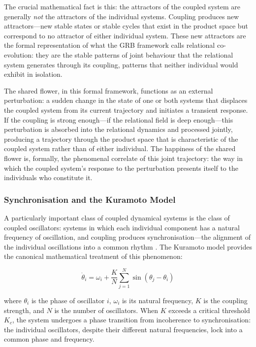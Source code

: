 The crucial mathematical fact is this: the attractors of the coupled system are generally \emph{not} the attractors of the individual systems. Coupling produces new attractors---new stable states or stable cycles that exist in the product space but correspond to no attractor of either individual system. These new attractors are the formal representation of what the GRB framework calls relational co-evolution: they are the stable patterns of joint behaviour that the relational system generates through its coupling, patterns that neither individual would exhibit in isolation.

The shared flower, in this formal framework, functions as an external perturbation: a sudden change in the state of one or both systems that displaces the coupled system from its current trajectory and initiates a transient response. If the coupling is strong enough---if the relational field is deep enough---this perturbation is absorbed into the relational dynamics and processed jointly, producing a trajectory through the product space that is characteristic of the coupled system rather than of either individual. The happiness of the shared flower is, formally, the phenomenal correlate of this joint trajectory: the way in which the coupled system's response to the perturbation presents itself to the individuals who constitute it.

\subsubsection{Synchronisation and the Kuramoto Model}
\label{p14:subsubsec:kuramoto}

\noindent
A particularly important class of coupled dynamical systems is the class of coupled oscillators: systems in which each individual component has a natural frequency of oscillation, and coupling produces synchronisation---the alignment of the individual oscillations into a common rhythm \parencite{kuramoto1984}. The Kuramoto model provides the canonical mathematical treatment of this phenomenon:

\begin{equation}
\dot{\theta}_i = \omega_i + \frac{K}{N} \sum_{j=1}^{N} \sin(\theta_j - \theta_i)
\end{equation}

where $\theta_i$ is the phase of oscillator $i$, $\omega_i$ is its natural frequency, $K$ is the coupling strength, and $N$ is the number of oscillators. When $K$ exceeds a critical threshold $K_c$, the system undergoes a phase transition from incoherence to synchronisation: the individual oscillators, despite their different natural frequencies, lock into a common phase and frequency.

